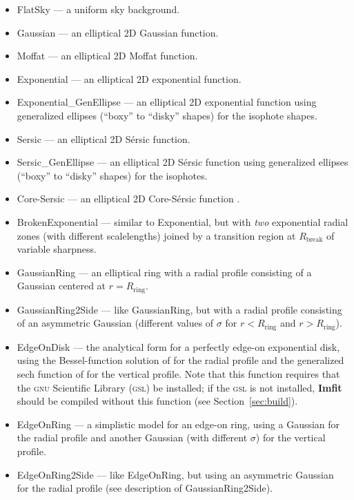 \documentclass[10pt,a4paper,article]{memoir}
\newcommand{\imfit}{\textbf{Imfit}}
\begin{document}
\begin{itemize}
\item FlatSky --- a uniform sky background.
\item Gaussian --- an elliptical 2D Gaussian function.
\item Moffat --- an elliptical 2D Moffat function.
\item Exponential --- an elliptical 2D exponential function.
\item Exponential\_GenEllipse --- an elliptical 2D exponential function using
generalized ellipses (``boxy'' to ``disky'' shapes) for the isophote shapes.
\item Sersic --- an elliptical 2D S\'ersic function.
\item Sersic\_GenEllipse --- an elliptical 2D S\'ersic function using
generalized ellipses (``boxy'' to ``disky'' shapes) for the isophotes.
\item Core-Sersic --- an elliptical 2D Core-S\'ersic function \citep{graham03,trujillo04}.
\item BrokenExponential --- similar to Exponential, but with \textit{two}
exponential radial zones (with different scalelengths) joined by a transition region
at $R_{\mathrm{break}}$ of variable sharpness.
\item GaussianRing --- an elliptical ring with a radial profile
consisting of a Gaussian centered at $r = R_{\mathrm{ring}}$.
\item GaussianRing2Side --- like GaussianRing, but with a radial profile
consisting of an asymmetric Gaussian (different values of $\sigma$ for
$r < R_{\mathrm{ring}}$ and $r > R_{\mathrm{ring}}$).
\item EdgeOnDisk --- the analytical form for a perfectly edge-on exponential
disk, using the Bessel-function solution of \citet{vdk81} for 
the radial profile and the generalized sech function of \citet{vdk88} 
for the vertical profile. Note that this function requires that the \textsc{gnu}
Scientific Library (\textsc{gsl}) be installed; if the \textsc{gsl} is not installed, \imfit{}
should be compiled without this function (see Section~\ref{sec:build}).
\item EdgeOnRing --- a simplistic model for an edge-on ring, using a
Gaussian for the radial profile and another Gaussian (with
different $\sigma$) for the vertical profile.
\item EdgeOnRing2Side --- like EdgeOnRing, but using an
asymmetric Gaussian for the radial profile (see description of GaussianRing2Side).

\end{itemize}
\end{document}
